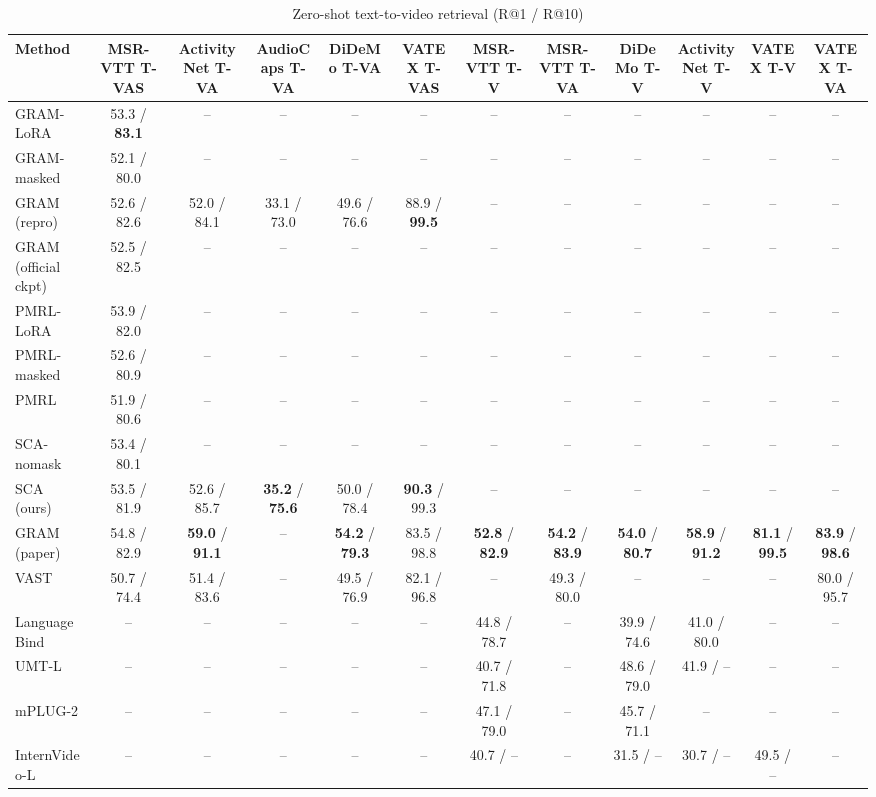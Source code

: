 \begin{table}[t]
\centering
\caption{Zero-shot text-to-video retrieval (R@1 / R@10)}
\label{tab:zeroshot_t2v}
\small
\begin{tabular}{lccccccccccc}
\toprule
Method & MSR-VTT T-VAS & ActivityNet T-VA & AudioCaps T-VA & DiDeMo T-VA & VATEX T-VAS & MSR-VTT T-V & MSR-VTT T-VA & DiDeMo T-V & ActivityNet T-V & VATEX T-V & VATEX T-VA \\
\midrule
GRAM-LoRA & 53.3 / \textbf{83.1} & -- & -- & -- & -- & -- & -- & -- & -- & -- & -- \\
GRAM-masked & 52.1 / 80.0 & -- & -- & -- & -- & -- & -- & -- & -- & -- & -- \\
GRAM (repro) & 52.6 / 82.6 & 52.0 / 84.1 & 33.1 / 73.0 & 49.6 / 76.6 & 88.9 / \textbf{99.5} & -- & -- & -- & -- & -- & -- \\
GRAM (official ckpt) & 52.5 / 82.5 & -- & -- & -- & -- & -- & -- & -- & -- & -- & -- \\
PMRL-LoRA & 53.9 / 82.0 & -- & -- & -- & -- & -- & -- & -- & -- & -- & -- \\
PMRL-masked & 52.6 / 80.9 & -- & -- & -- & -- & -- & -- & -- & -- & -- & -- \\
PMRL & 51.9 / 80.6 & -- & -- & -- & -- & -- & -- & -- & -- & -- & -- \\
SCA-nomask & 53.4 / 80.1 & -- & -- & -- & -- & -- & -- & -- & -- & -- & -- \\
SCA (ours) & 53.5 / 81.9 & 52.6 / 85.7 & \textbf{35.2} / \textbf{75.6} & 50.0 / 78.4 & \textbf{90.3} / 99.3 & -- & -- & -- & -- & -- & -- \\
GRAM (paper) & 54.8 / 82.9 & \textbf{59.0} / \textbf{91.1} & -- & \textbf{54.2} / \textbf{79.3} & 83.5 / 98.8 & \textbf{52.8} / \textbf{82.9} & \textbf{54.2} / \textbf{83.9} & \textbf{54.0} / \textbf{80.7} & \textbf{58.9} / \textbf{91.2} & \textbf{81.1} / \textbf{99.5} & \textbf{83.9} / \textbf{98.6} \\
VAST & 50.7 / 74.4 & 51.4 / 83.6 & -- & 49.5 / 76.9 & 82.1 / 96.8 & -- & 49.3 / 80.0 & -- & -- & -- & 80.0 / 95.7 \\
LanguageBind & -- & -- & -- & -- & -- & 44.8 / 78.7 & -- & 39.9 / 74.6 & 41.0 / 80.0 & -- & -- \\
UMT-L & -- & -- & -- & -- & -- & 40.7 / 71.8 & -- & 48.6 / 79.0 & 41.9 / -- & -- & -- \\
mPLUG-2 & -- & -- & -- & -- & -- & 47.1 / 79.0 & -- & 45.7 / 71.1 & -- & -- & -- \\
InternVideo-L & -- & -- & -- & -- & -- & 40.7 / -- & -- & 31.5 / -- & 30.7 / -- & 49.5 / -- & -- \\

\end{tabular}
\end{table}
